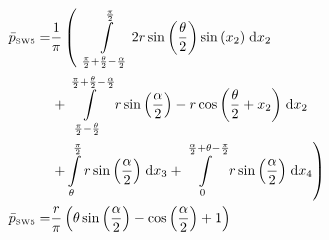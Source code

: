 \begin{align}
    \bar{p}_{\text{\tiny{SW5}}} =&\frac{1}{\pi} \left(\;\;\int\limits_{\frac{\pi}{2} + \frac{\theta}{2} - \frac{\alpha}{2}}^{\frac{\pi}{2}}2 r \sin{\left (\frac{\theta}{2} \right )} \sin{\left (x_{2} \right )}\;\mathrm{d}x_{2}\right.\notag\\
 &\left.+\int\limits_{\frac{\pi}{2} - \frac{\theta}{2}}^{\frac{\pi}{2} + \frac{\theta}{2} - \frac{\alpha}{2}}r \sin{\left (\frac{\alpha}{2} \right )} - r \cos{\left (\frac{\theta}{2} + x_{2} \right )}\;\mathrm{d}x_{2}\right.\notag\\
 &\left.+\int\limits_{\theta}^{\frac{\pi}{2}}r \sin{\left (\frac{\alpha}{2} \right )}\;\mathrm{d}x_{3}+\int\limits_{0}^{\frac{\alpha}{2} + \theta - \frac{\pi}{2}}r \sin{\left (\frac{\alpha}{2} \right )}\;\mathrm{d}x_{4}\right)\label{pSW5Def}\\
    \bar{p}_{\text{\tiny{SW5}}}  =& \frac{r}{\pi} \left(\theta \sin{\left (\frac{\alpha}{2} \right )} - \cos{\left (\frac{\alpha}{2} \right )} + 1\right)\label{pSW5Sln}
\end{align} 
